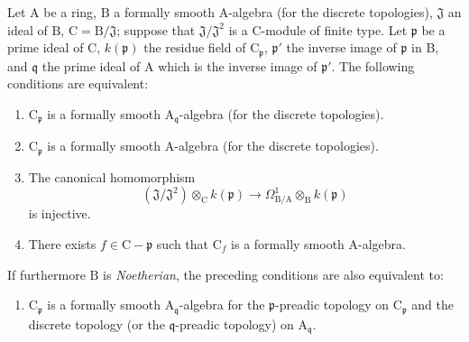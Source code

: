 \begin{proposition}[22.6.4]
\label{0.22.6.4}
Let $\mathrm{A}$ be a ring, $\mathrm{B}$ a formally smooth $\mathrm{A}$-algebra (for the discrete topologies), $\mathfrak{J}$ an ideal of $\mathrm{B}$, $\mathrm{C}=\mathrm{B}/\mathfrak{J}$; suppose that $\mathfrak{J}/\mathfrak{J}^2$ is a $\mathrm{C}$-module of finite type.
Let $\mathfrak{p}$ be a prime ideal of $\mathrm{C}$,
$k(\mathfrak{p})$ the residue field of $\mathrm{C}_\mathfrak{p}$,
$\mathfrak{p}'$ the inverse image of $\mathfrak{p}$ in $\mathrm{B}$, and
$\mathfrak{q}$ the prime ideal of $\mathrm{A}$ which is the inverse image of
$\mathfrak{p}'$.
The following conditions are equivalent:
\begin{enumerate}
  \item[a)] $\mathrm{C}_\mathfrak{p}$ is a formally smooth $\mathrm{A}_{\mathfrak{q}}$-algebra (for the discrete topologies).
  \item[a')] $\mathrm{C}_\mathfrak{p}$ is a formally smooth $\mathrm{A}$-algebra (for the discrete topologies).
  \item[b)] The canonical homomorphism
\[
\label{0.22.6.4.1}
  (\mathfrak{J}/\mathfrak{J}^2)\otimes_\mathrm{C}k(\mathfrak{p})\to\Omega^1_{\mathrm{B}/\mathrm{A}}\otimes_\mathrm{B}k(\mathfrak{p})
  \tag{22.6.4.1}
\]
  is injective.
  \item[c)] There exists $f\in\mathrm{C}-\mathfrak{p}$ such that
  $\mathrm{C}_f$ is a formally smooth $\mathrm{A}$-algebra.
\end{enumerate}

If furthermore $\mathrm{B}$ is \emph{Noetherian}, the preceding conditions are also equivalent to:
\begin{enumerate}
  \item[d)] $\mathrm{C}_\mathfrak{p}$ is a formally smooth
  $\mathrm{A}_{\mathfrak{q}}$-algebra for the $\mathfrak{p}$-preadic topology
  on $\mathrm{C}_\mathfrak{p}$ and the discrete topology (or the
  $\mathfrak{q}$-preadic topology) on $\mathrm{A}_{\mathfrak{q}}$.
\end{enumerate}
\end{proposition}

